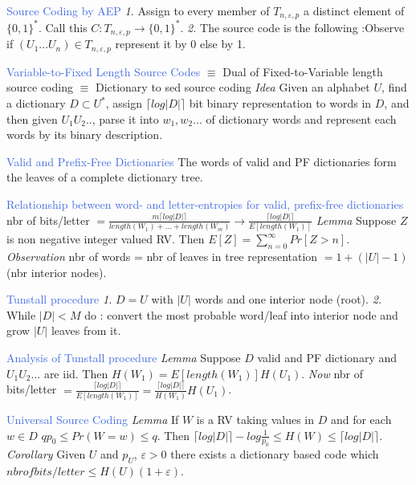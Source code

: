 \documentclass[10pt,a4paper,landscape]{article}
\newcommand{\concept}[1]{\textcolor{RoyalBlue}{#1}}
\newcommand{\subconcept}[1]{\textcolor{PineGreen}{\textit{#1}}}
\renewcommand{\section}[1]{
    \vspace{-0.3cm}
    \begin{center}
      \color{Bittersweet}
      \hrulefill{\small~~#1~~}\hrulefill
    \end{center}
    \vspace{-0.3cm}
  }
\begin{document}
\begin{multicols*}{4}
\concept{Source Coding by AEP}
\subconcept{1.} Assign to every member of $T_{n,\varepsilon,p}$ a distinct element of $\{0,1\}^*$. Call this $C:T_{n,\varepsilon,p} \to \{0,1\}^*$.
\subconcept{2.} The source code is the following :Observe if $(U_1...U_n) \in T_{n,\varepsilon,p}$ represent it by 0 else by 1.

\concept{Variable-to-Fixed Length Source Codes}
$\equiv$ Dual of Fixed-to-Variable length source coding
$\equiv$ Dictionary to sed source coding
\subconcept{Idea} Given an alphabet $U$, find a dictionary $D \subset U^*$, assign $\lceil log|D| \rceil$ bit binary representation to words in $D$, and then given $U_1U_2..$, parse it into $w_1,w_2...$ of dictionary words and represent each words by its binary description.

\concept{Valid and Prefix-Free Dictionaries} 
The words of valid and PF dictionaries form the leaves of a complete dictionary tree.

\concept{Relationship between word- and letter-entropies for valid, prefix-free dictionaries}
nbr of bits/letter $=\frac{m\lceil log|D| \rceil}{length(W_1)+...+length(W_m)} \to \frac{\lceil log|D| \rceil}{E[length(W_1)]}$
\subconcept{Lemma} Suppose $Z$ is non negative integer valued RV. Then $E[Z]=\sum_{n=0}^\infty Pr[Z>n]$.
\subconcept{Observation} nbr of words = nbr of leaves in tree representation $=1+(|U|-1)$(nbr interior nodes).
\section{Tunstall procedure}

\concept{Tunstall procedure} 
\subconcept{1.} $D=U$ with $|U|$ words and one interior node (root).
\subconcept{2.} While $|D|<M$ do :
convert the most probable word/leaf into interior node and grow $|U|$ leaves from it.

\concept{Analysis of Tunstall procedure}
\subconcept{Lemma} Suppose $D$ valid and PF dictionary and $U_1U_2...$ are iid. Then $H(W_1)=E[length(W_1)]H(U_1)$.
\subconcept{Now} nbr of bits/letter $=\frac{\lceil log|D| \rceil}{E[length(W_1)]}=\frac{\lceil log|D| \rceil}{H(W_1)}H(U_1)$.

\concept{Universal Source Coding} 
\subconcept{Lemma} If $W$ is a RV taking values in $D$ and for each $w\in D$ $q p_0 \le Pr(W=w) \le q$. Then $\lceil log|D| \rceil - log\frac{1}{p_0} \le H(W) \le \lceil log|D| \rceil$.
\subconcept{Corollary} Given $U$ and $p_U$, $\varepsilon > 0$ there exists a dictionary based code which $nbr of bits/letter \le H(U)(1+\varepsilon)$.


\end{multicols*}
\end{document}
